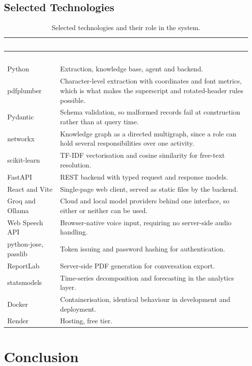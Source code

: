 \subsection{Selected Technologies}

\begin{longtable}{|p{}|p{}|}
\caption{Selected technologies and their role in the system.}\label{tab:tech}\\
\hline
\rowcolor{myblue}\textcolor{white}{\textbf{Technology}} & \textcolor{white}{\textbf{Role}} \\
\hline
\endfirsthead
\hline
\rowcolor{myblue}\textcolor{white}{\textbf{Technology}} & \textcolor{white}{\textbf{Role}} \\
\hline
\endhead
Python & Extraction, knowledge base, agent and backend. \\ \hline
pdfplumber & Character-level extraction with coordinates and font metrics, which is what makes the superscript and rotated-header rules possible. \\ \hline
Pydantic & Schema validation, so malformed records fail at construction rather than at query time. \\ \hline
networkx & Knowledge graph as a directed multigraph, since a role can hold several responsibilities over one activity. \\ \hline
scikit-learn & TF-IDF vectorisation and cosine similarity for free-text resolution. \\ \hline
FastAPI & REST backend with typed request and response models. \\ \hline
React and Vite & Single-page web client, served as static files by the backend. \\ \hline
Groq and Ollama & Cloud and local model providers behind one interface, so either or neither can be used. \\ \hline
Web Speech API & Browser-native voice input, requiring no server-side audio handling. \\ \hline
python-jose, passlib & Token issuing and password hashing for authentication. \\ \hline
ReportLab & Server-side PDF generation for conversation export. \\ \hline
statsmodels & Time-series decomposition and forecasting in the analytics layer. \\ \hline
Docker & Containerisation, identical behaviour in development and deployment. \\ \hline
Render & Hosting, free tier. \\ \hline
\end{longtable}

\section*{Conclusion}

